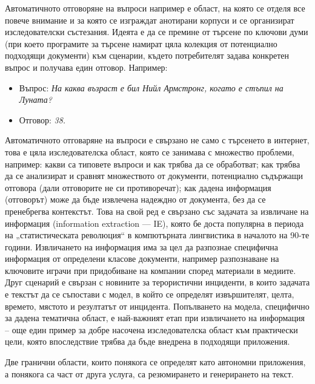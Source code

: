 \documentclass[]{../../metanetpaper}
\begin{document}
\begin{multicols}{2}
Автоматичното отговоряне на въпроси например е област, на която се отделя все повече внимание и за която се изграждат анотирани корпуси и се организират изследователски състезания. Идеята е да се премине от търсене по ключови думи (при което програмите за търсене намират цяла колекция от потенциално
 подходящи документи) към сценарии, където потребителят задава конкретен въпрос и получава един отговор. Например: 
\begin{itemize}
\item[] Въпрос: {\it На каква възраст е бил Нийл Армстронг, когато е стъпил на Луната?}
\item[] Отговор: {\it 38.}
\end{itemize}

Автоматичното отговаряне на въпроси е свързано не само с търсенето в интернет, това е цяла изследователска област, която се занимава с множество проблеми, например: какви са типовете въпроси и как трябва да се обработват; как трябва да се анализират и сравнят множеството от документи, потенциално
 съдържащи отговора (дали отговорите не си противоречат); как
дадена информация (отговорът) може да бъде извлечена  надеждно от документа, без да се пренебрегва контекстът.
Това на свой ред е свързано със задачата за извличане на информация (information extraction — IE), която бе доста популярна в периода на „статистическата революция“ в компютърната лингвистика в началото на 90-те години. Извличането на информация има за цел да разпознае специфична информация от определени класове документи, например разпознаване на ключовите играчи при
 придобиване на компании според материали в медиите. Друг сценарий е свързан с новините за терористични инциденти, в които задачата е текстът да се съпостави  с модел, в който се определят извършителят, целта, времето, мястото и резултатът от инцидента. Попълването на модела, специфично за дадена тематична област, е най-важният етап при извличането на информация – още
 един пример за добре насочена изследователска област към практически цели, която впоследствие трябва да бъде внедрена в подходящи приложения.

Две гранични области, които понякога се определят като автономни приложения, а понякога са част от друга услуга, са резюмирането и генерирането на текст. 


\end{multicols}
\end{document}
